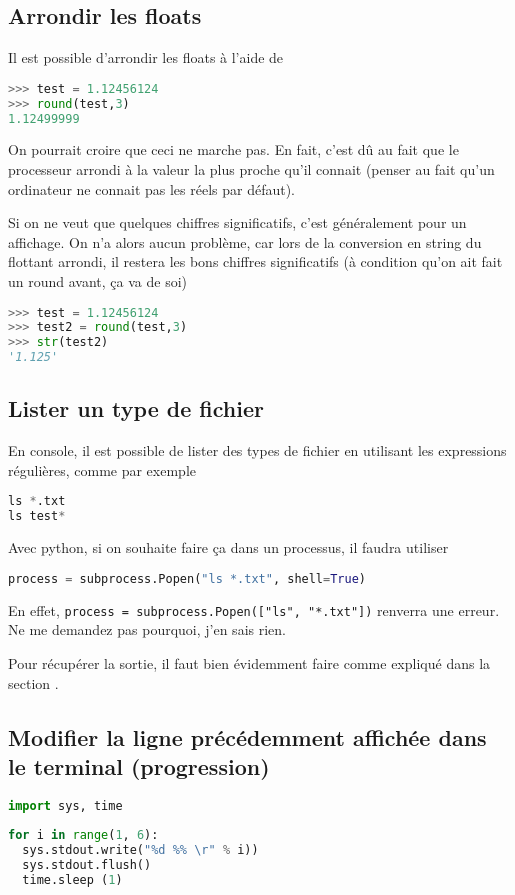 \documentclass[a4paper,twoside]{article}
\begin{document}
\subsection{Arrondir les floats}
Il est possible d'arrondir les floats à l'aide de
\begin{lstlisting}[language=python]
>>> test = 1.12456124
>>> round(test,3)
1.12499999
\end{lstlisting}

On pourrait croire que ceci ne marche pas. En fait, c'est dû au fait que le processeur arrondi à la valeur la plus proche qu'il connait (penser au fait qu'un ordinateur ne connait pas les réels par défaut).

Si on ne veut que quelques chiffres significatifs, c'est généralement pour un affichage. On n'a alors aucun problème, car lors de la conversion en string du flottant arrondi, il restera les bons chiffres significatifs (à condition qu'on ait fait un round avant, ça va de soi)
\begin{lstlisting}[language=python]
>>> test = 1.12456124
>>> test2 = round(test,3)
>>> str(test2)
'1.125'
\end{lstlisting}

\subsection{Lister un type de fichier}
En console, il est possible de lister des types de fichier en utilisant les expressions régulières, comme par exemple
\begin{lstlisting}[language=python]
ls *.txt
ls test*
\end{lstlisting}

Avec python, si on souhaite faire ça dans un processus, il faudra utiliser
\begin{lstlisting}[language=python]
process = subprocess.Popen("ls *.txt", shell=True)
\end{lstlisting}

En effet, \verb|process = subprocess.Popen(["ls", "*.txt"])| renverra une erreur. Ne me demandez pas pourquoi, j'en sais rien.

\begin{remarque}
Pour récupérer la sortie, il faut bien évidemment faire comme expliqué dans la section .
\end{remarque}

\subsection{Modifier la ligne précédemment affichée dans le terminal (progression)}	
\begin{lstlisting}[language=python]
import sys, time
 
for i in range(1, 6):
  sys.stdout.write("%d %% \r" % i))
  sys.stdout.flush()
  time.sleep (1)
\end{lstlisting}
\end{document}
